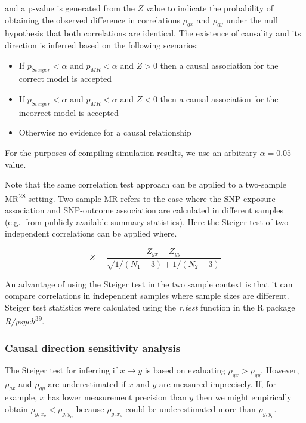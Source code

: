 \documentclass[]{article}
\providecommand{\tightlist}{%
  \setlength{\itemsep}{0pt}\setlength{\parskip}{0pt}}
\begin{document}
and a p-value is generated from the \(Z\) value to indicate the
probability of obtaining the observed difference in correlations
\(\rho_{gx}\) and \(\rho_{gy}\) under the null hypothesis that both
correlations are identical. The existence of causality and its direction
is inferred based on the following scenarios:

\begin{itemize}
\tightlist
\item
  If \(p_{Steiger} < \alpha\) and \(p_{MR} < \alpha\) and \(Z > 0\) then
  a causal association for the correct model is accepted
\item
  If \(p_{Steiger} < \alpha\) and \(p_{MR} < \alpha\) and \(Z < 0\) then
  a causal association for the incorrect model is accepted
\item
  Otherwise no evidence for a causal relationship
\end{itemize}

For the purposes of compiling simulation results, we use an arbitrary
\(\alpha = 0.05\) value.

Note that the same correlation test approach can be applied to a
two-sample MR\textsuperscript{28} setting. Two-sample MR refers to the
case where the SNP-exposure association and SNP-outcome association are
calculated in different samples (e.g.~from publicly available summary
statistics). Here the Steiger test of two independent correlations can
be applied where.

\[
Z = \frac{Z_{gx} - Z_{gy}} { \sqrt{ 1 / (N_{1} - 3) + 1 / (N_{2} - 3) } }
\]

An advantage of using the Steiger test in the two sample context is that
it can compare correlations in independent samples where sample sizes
are different. Steiger test statistics were calculated using the
\emph{r.test} function in the R package
\emph{R/psych}\textsuperscript{39}.

\subsubsection{Causal direction sensitivity
analysis}\label{causal-direction-sensitivity-analysis}

The Steiger test for inferring if \(x \rightarrow y\) is based on
evaluating \(\rho_{gx} > \rho_{gy}\). However, \(\rho_{gx}\) and
\(\rho_{gy}\) are underestimated if \(x\) and \(y\) are measured
imprecisely. If, for example, \(x\) has lower measurement precision than
\(y\) then we might empirically obtain \(\rho_{g,x_o} < \rho_{g,y_o}\)
because \(\rho_{g,x_o}\) could be underestimated more than
\(\rho_{g,y_o}\).
\end{document}

